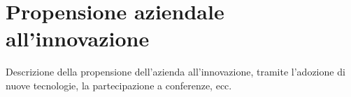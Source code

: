 \section{Propensione aziendale all'innovazione}
\label{sez:propensione-a-innovazione}

Descrizione della propensione dell'azienda all'innovazione, tramite l'adozione di nuove tecnologie, la partecipazione a conferenze, ecc.\\
